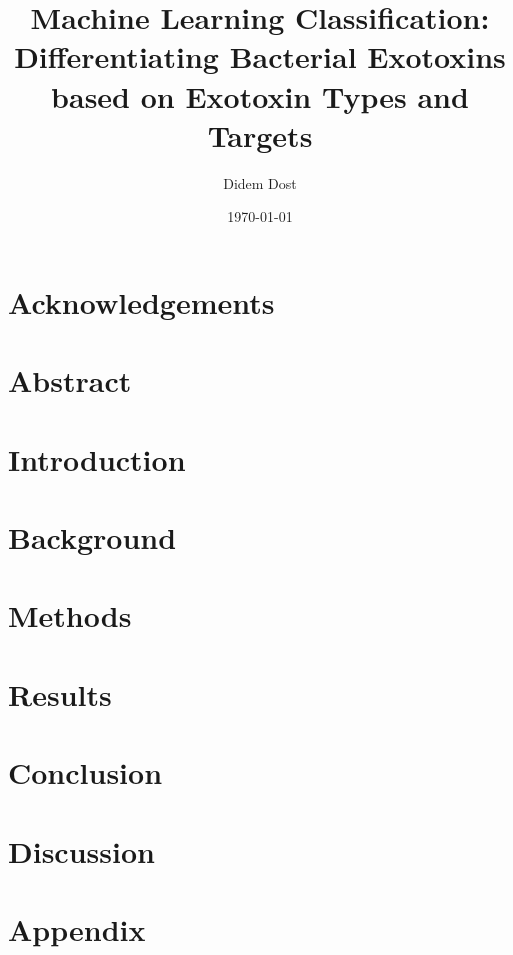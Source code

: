 \documentclass[12pt]{report} %
\begin{document}
\title{Machine Learning Classification: Differentiating Bacterial Exotoxins based on Exotoxin Types and Targets}
\author{Didem Dost}
\date{\today}
	
	\maketitle
	
	\chapter*{Acknowledgements}
	
	
	\chapter*{Abstract}
	
	
	\tableofcontents
	
	\chapter{Introduction}
	
	
	\chapter{Background}
	
	
	\chapter{Methods}
	
	
	\chapter{Results}
	
	
	\chapter{Conclusion}
	
	
	\chapter{Discussion}
	
	
	\chapter*{Appendix}
	
	
	 
	
\end{document}
